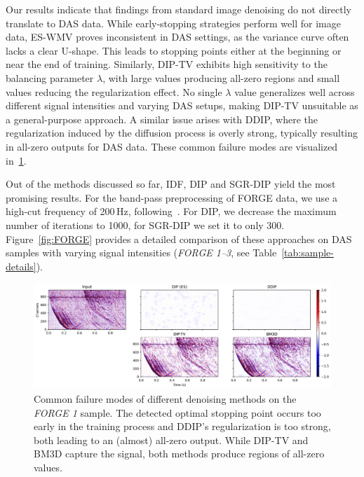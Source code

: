 Our results indicate that findings from standard image denoising do not directly translate to DAS data.
While early-stopping strategies perform well for image data, ES-WMV proves inconsistent in DAS settings, as the variance curve often lacks a clear U-shape.
This leads to stopping points either at the beginning or near the end of training.
Similarly, DIP-TV exhibits high sensitivity to the balancing parameter $\lambda$, with large values producing all-zero regions and small values reducing the regularization effect.
No single $\lambda$ value generalizes well across different signal intensities and varying DAS setups, making DIP-TV unsuitable as a general-purpose approach.
A similar issue arises with DDIP, where the regularization induced by the diffusion process is overly strong, typically resulting in all-zero outputs for DAS data.
These common failure modes are visualized in~\ref{fig:failure-cases}.

Out of the methods discussed so far, IDF, DIP and SGR-DIP yield the most promising results.
For the band-pass preprocessing of FORGE data, we use a high-cut frequency of 200\,Hz, following~\cite{IDF}.
For DIP, we decrease the maximum number of iterations to 1000, for SGR-DIP we set it to only 300.
Figure~\ref{fig:FORGE} provides a detailed comparison of these approaches on DAS samples with varying signal intensities (\textit{FORGE 1--3}, see Table~\ref{tab:sample-details}).

\begin{figure}[b!]
    \centering
    \includegraphics[width=\textwidth]{img/fig_6.3.png}
    \caption{
        Common failure modes of different denoising methods on the \textit{FORGE 1} sample.
        The detected optimal stopping point occurs too early in the training process and DDIP's regularization is too strong, both leading to an (almost) all-zero output.
        While DIP-TV and BM3D capture the signal, both methods produce regions of all-zero values.
    }\label{fig:failure-cases}
\end{figure}

